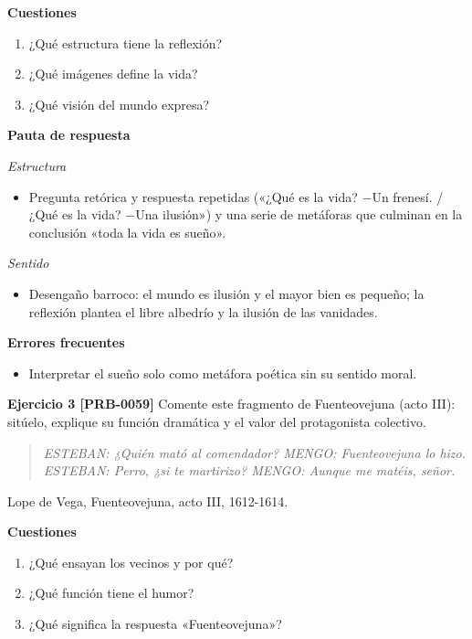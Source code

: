 \documentclass{book}
\begin{document}
\noindent\textbf{Cuestiones}
\begin{enumerate}
\item ¿Qué estructura tiene la reflexión?
\item ¿Qué imágenes define la vida?
\item ¿Qué visión del mundo expresa?
\end{enumerate}

\noindent\textbf{Pauta de respuesta}

\noindent\textit{Estructura}
\begin{itemize}
\item Pregunta retórica y respuesta repetidas («¿Qué es la vida? \(-\)Un frenesí. / ¿Qué es la vida? \(-\)Una ilusión») y una serie de metáforas que culminan en la conclusión «toda la vida es sueño».
\end{itemize}

\noindent\textit{Sentido}
\begin{itemize}
\item Desengaño barroco: el mundo es ilusión y el mayor bien es pequeño; la reflexión plantea el libre albedrío y la ilusión de las vanidades.
\end{itemize}

\noindent\textbf{Errores frecuentes}
\begin{itemize}
\item Interpretar el sueño solo como metáfora poética sin su sentido moral.
\end{itemize}

\noindent\textbf{Ejercicio 3 [PRB-0059]}
Comente este fragmento de Fuenteovejuna (acto III): sitúelo, explique su función dramática y el valor del protagonista colectivo.


\begin{quote}
\itshape ESTEBAN: ¿Quién mató al comendador? MENGO: Fuenteovejuna lo hizo. ESTEBAN: Perro, ¿si te martirizo? MENGO: Aunque me matéis, señor.
\end{quote}
{\noindent\footnotesize Lope de Vega, Fuenteovejuna, acto III, 1612-1614.\par}

\noindent\textbf{Cuestiones}
\begin{enumerate}
\item ¿Qué ensayan los vecinos y por qué?
\item ¿Qué función tiene el humor?
\item ¿Qué significa la respuesta «Fuenteovejuna»?
\end{enumerate}
\end{document}
